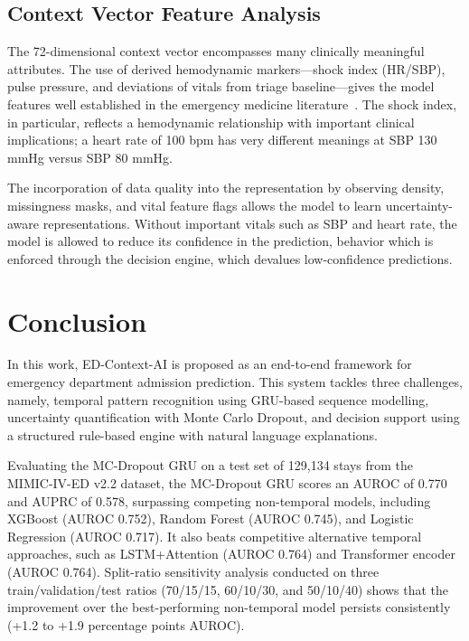\documentclass[runningheads]{llncs}
\begin{document}
\subsection{Context Vector Feature Analysis}

The 72-dimensional context vector encompasses many clinically meaningful attributes. The use of derived hemodynamic markers---shock index (HR/SBP), pulse pressure, and deviations of vitals from triage baseline---gives the model features well established in the emergency medicine literature~\cite{Koch2019}. The shock index, in particular, reflects a hemodynamic relationship with important clinical implications; a heart rate of 100 bpm has very different meanings at SBP 130 mmHg versus SBP 80 mmHg.

The incorporation of data quality into the representation by observing density, missingness masks, and vital feature flags allows the model to learn uncertainty-aware representations. Without important vitals such as SBP and heart rate, the model is allowed to reduce its confidence in the prediction, behavior which is enforced through the decision engine, which devalues low-confidence predictions.

\section{Conclusion}

In this work, ED-Context-AI is proposed as an end-to-end framework for emergency department admission prediction. This system tackles three challenges, namely, temporal pattern recognition using GRU-based sequence modelling, uncertainty quantification with Monte Carlo Dropout, and decision support using a structured rule-based engine with natural language explanations.

Evaluating the MC-Dropout GRU on a test set of 129,134 stays from the MIMIC-IV-ED v2.2 dataset, the MC-Dropout GRU scores an AUROC of 0.770 and AUPRC of 0.578, surpassing competing non-temporal models, including XGBoost (AUROC 0.752), Random Forest (AUROC 0.745), and Logistic Regression (AUROC 0.717). It also beats competitive alternative temporal approaches, such as LSTM+Attention (AUROC 0.764) and Transformer encoder (AUROC 0.764). Split-ratio sensitivity analysis conducted on three train/validation/test ratios (70/15/15, 60/10/30, and 50/10/40) shows that the improvement over the best-performing non-temporal model persists consistently (+1.2 to +1.9 percentage points AUROC).
\end{document}
